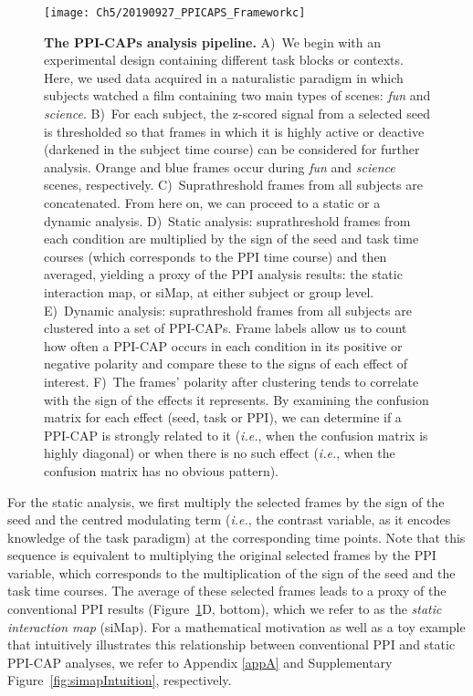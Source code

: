 \begin{figure}[!ph]
\centering
\texttt{[image: Ch5/20190927\_PPICAPS\_Frameworkc]}
\caption{\textbf{The PPI-CAPs analysis pipeline.} A)~We begin with an experimental design containing different task blocks or contexts. Here, we used data acquired in a naturalistic paradigm in which subjects watched a film containing two main types of scenes: \textit{fun} and \textit{science}. B)~For each subject, the z-scored signal from a selected seed is thresholded so that frames in which it is highly active or deactive (darkened in the subject time course) can be considered for further analysis. Orange and blue frames occur during \textit{fun} and \textit{science} scenes, respectively. C)~Suprathreshold frames from all subjects are concatenated. From here on, we can proceed to a static or a dynamic analysis. D)~Static analysis: suprathreshold frames from each condition are multiplied by the sign of the seed and task time courses (which corresponds to the PPI time course) and then averaged, yielding a proxy of the PPI analysis results: the static interaction map, or siMap, at either subject or group level.  E)~Dynamic analysis: suprathreshold frames from all subjects are clustered into a set of PPI-CAPs. Frame labels allow us to count how often a PPI-CAP occurs in each condition in its positive or negative polarity and compare these to the signs of each effect of interest. F)~The frames' polarity after clustering tends to correlate with the sign of the effects it represents. By examining the confusion matrix for each effect (seed, task or PPI), we can determine if a PPI-CAP is strongly related to it (\textit{i.e.}, when the confusion matrix is highly diagonal) or when there is no such effect (\textit{i.e.}, when the confusion matrix has no obvious pattern). }
\label{PPI_CAPs_fw}
\end{figure}


For the static analysis, we first multiply the selected frames by the sign of the seed and the centred modulating term (\textit{i.e.}, the contrast variable, as it encodes knowledge of the task paradigm) at the corresponding time points. Note that this sequence is equivalent to multiplying the original selected frames by the PPI variable, which corresponds to the multiplication of the sign of the seed and the task time courses. The average of these selected frames leads to a proxy of the conventional PPI results (Figure~\ref{PPI_CAPs_fw}D, bottom), which we refer to as the \textit{static interaction map} (siMap). For a mathematical motivation as well as a toy example that intuitively illustrates this relationship between conventional PPI and static PPI-CAP analyses, we refer to Appendix \ref{appA} and Supplementary Figure~\ref{fig:simapIntuition}, respectively.

